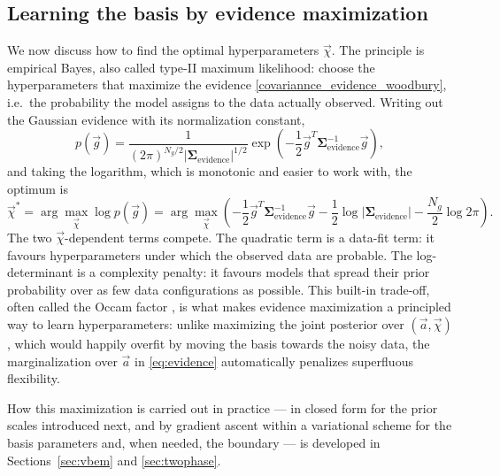 \documentclass{article}
\begin{document}
\subsection{Learning the basis by evidence maximization} \label{sec:evidence_maximization}
We now discuss how to find the optimal hyperparameters $\vec{\chi}$. The principle is empirical Bayes, also called type-II maximum likelihood: choose the hyperparameters that maximize the evidence \eqref{covariannce_evidence_woodbury}, i.e.\ the probability the model assigns to the data actually observed. Writing out the Gaussian evidence with its normalization constant,
\begin{equation}
   p(\vec{g}) = \frac{1}{(2\pi)^{N_g/2} |\mathbf{\Sigma}_{\text{evidence}}|^{1/2}} \exp\left(-\frac{1}{2}\vec{g}^T \mathbf{\Sigma}_{\text{evidence}}^{-1} \vec{g}\right),
\end{equation}
and taking the logarithm, which is monotonic and easier to work with, the optimum is
\begin{equation}
    \vec{\chi}^* = \arg\max_{\vec{\chi}} \log p(\vec{g}) = \arg\max_{\vec{\chi}} \left(-\frac{1}{2}\vec{g}^T \mathbf{\Sigma}_{\text{evidence}}^{-1} \vec{g} - \frac{1}{2}\log |\mathbf{\Sigma}_{\text{evidence}}| - \frac{N_g}{2}\log 2\pi \right). \label{eq:log_evidence}
\end{equation}
The two $\vec\chi$-dependent terms compete. The quadratic term is a data-fit term: it favours hyperparameters under which the observed data are probable. The log-determinant is a complexity penalty: it favours models that spread their prior probability over as few data configurations as possible. This built-in trade-off, often called the Occam factor \cite{mackay1992bayesian}, is what makes evidence maximization a principled way to learn hyperparameters: unlike maximizing the joint posterior over $(\vec a, \vec\chi)$, which would happily overfit by moving the basis towards the noisy data, the marginalization over $\vec a$ in \eqref{eq:evidence} automatically penalizes superfluous flexibility.

How this maximization is carried out in practice --- in closed form for the prior scales introduced next, and by gradient ascent within a variational scheme for the basis parameters and, when needed, the boundary --- is developed in Sections~\ref{sec:vbem} and \ref{sec:twophase}.
\end{document}
